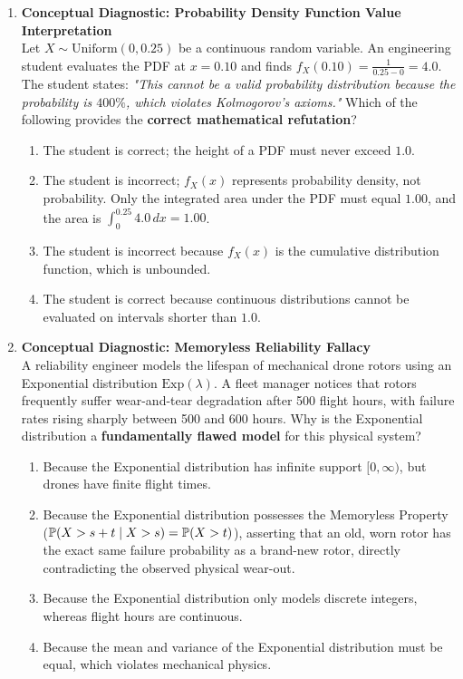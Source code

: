 \begin{enumerate}[resume]
\item \textbf{Conceptual Diagnostic: Probability Density Function Value Interpretation} \\
Let $X \sim \text{Uniform}(0, 0.25)$ be a continuous random variable. An engineering student evaluates the PDF at $x = 0.10$ and finds $f_X(0.10) = \frac{1}{0.25 - 0} = 4.0$. The student states: \textit{"This cannot be a valid probability distribution because the probability is $400\%$, which violates Kolmogorov's axioms."} Which of the following provides the \textbf{correct mathematical refutation}?
\begin{enumerate}
    \item The student is correct; the height of a PDF must never exceed $1.0$.
    \item The student is incorrect; $f_X(x)$ represents probability density, not probability. Only the integrated area under the PDF must equal $1.00$, and the area is $\int_0^{0.25} 4.0 \, dx = 1.00$.
    \item The student is incorrect because $f_X(x)$ is the cumulative distribution function, which is unbounded.
    \item The student is correct because continuous distributions cannot be evaluated on intervals shorter than $1.0$.
\end{enumerate}

\item \textbf{Conceptual Diagnostic: Memoryless Reliability Fallacy} \\
A reliability engineer models the lifespan of mechanical drone rotors using an Exponential distribution $\text{Exp}(\lambda)$. A fleet manager notices that rotors frequently suffer wear-and-tear degradation after 500 flight hours, with failure rates rising sharply between 500 and 600 hours. Why is the Exponential distribution a \textbf{fundamentally flawed model} for this physical system?
\begin{enumerate}
    \item Because the Exponential distribution has infinite support $[0, \infty)$, but drones have finite flight times.
    \item Because the Exponential distribution possesses the Memoryless Property ($\P(X > s + t \mid X > s) = \P(X > t)$), asserting that an old, worn rotor has the exact same failure probability as a brand-new rotor, directly contradicting the observed physical wear-out.
    \item Because the Exponential distribution only models discrete integers, whereas flight hours are continuous.
    \item Because the mean and variance of the Exponential distribution must be equal, which violates mechanical physics.
\end{enumerate}
\end{enumerate}
